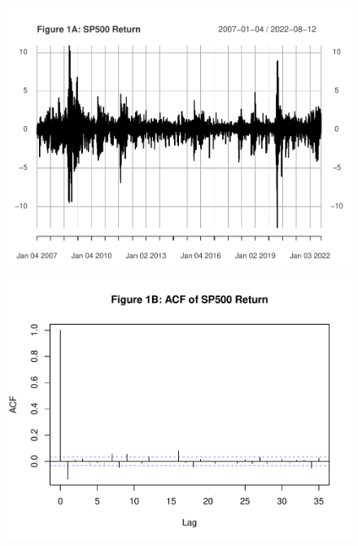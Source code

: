 \documentclass[]{book}
\theoremstyle{definition}
\theoremstyle{definition}
\theoremstyle{definition}
\theoremstyle{remark}
\begin{document}
\begin{figure}

{\centering \includegraphics[width=1\linewidth]{bookdown-demo_files/figure-latex/ch7-figure1-1} 

}

\end{figure}
\begin{figure}

{\centering \includegraphics[width=1\linewidth]{bookdown-demo_files/figure-latex/ch7-figure1-2} 

}

\end{figure}
\end{document}

